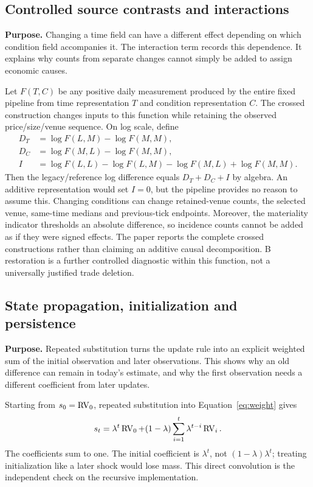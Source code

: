 \subsection{Controlled source contrasts and interactions}\label{app:cross}
\textbf{Purpose.} Changing a time field can have a different effect depending on which condition field accompanies it. The interaction term records this dependence. It explains why counts from separate changes cannot simply be added to assign economic causes.

Let $F(T,C)$ be any positive daily measurement produced by the entire fixed pipeline from time representation $T$ and condition representation $C$. The crossed construction changes inputs to this function while retaining the observed price/size/venue sequence. On log scale, define
\begin{align}
 D_T&=\log F(L,M)-\log F(M,M),\\
 D_C&=\log F(M,L)-\log F(M,M),\\
 I&=\log F(L,L)-\log F(L,M)-\log F(M,L)+\log F(M,M).
\end{align}
Then the legacy/reference log difference equals $D_T+D_C+I$ by algebra. An additive representation would set $I=0$, but the pipeline provides no reason to assume this. Changing conditions can change retained-venue counts, the selected venue, same-time medians and previous-tick endpoints. Moreover, the materiality indicator thresholds an absolute difference, so incidence counts cannot be added as if they were signed effects. The paper reports the complete crossed constructions rather than claiming an additive causal decomposition. B restoration is a further controlled diagnostic within this function, not a universally justified trade deletion.

\subsection{State propagation, initialization and persistence}\label{app:state}
\textbf{Purpose.} Repeated substitution turns the update rule into an explicit weighted sum of the initial observation and later observations. This shows why an old difference can remain in today's estimate, and why the first observation needs a different coefficient from later updates.

Starting from $s_0=\operatorname{RV}_0$, repeated substitution into Equation~\eqref{eq:weight} gives
\begin{equation}
 s_t=\lambda^t\operatorname{RV}_0+(1-\lambda)\sum_{i=1}^t\lambda^{t-i}\operatorname{RV}_i.\label{eq:convolution}
\end{equation}
The coefficients sum to one. The initial coefficient is $\lambda^t$, not $(1-\lambda)\lambda^t$; treating initialization like a later shock would lose mass. This direct convolution is the independent check on the recursive implementation.

